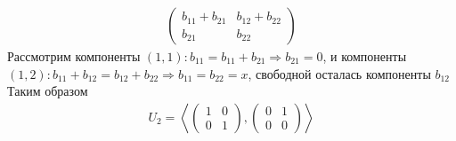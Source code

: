 \begin{itemize}
\begin{gather}
        \begin{pmatrix}
            b_{11} + b_{21} & b_{12} + b_{22} \\
            b_{21} & b_{22}
        \end{pmatrix}
    \end{gather}
    Рассмотрим компоненты $(1, 1):b_{11} = b_{11} + b_{21} \Longrightarrow b_{21} = 0$, и компоненты $(1,2): b_{11} + b_{12} = b_{12} + b_{22} \Longrightarrow b_{11}=b_{22}=x$, свободной осталась компоненты $b_{12}$
    Таким образом
    \begin{gather}
        U_2 =
        \left<
            \begin{pmatrix}
                1 & 0 \\
                0 & 1
            \end{pmatrix},
            \begin{pmatrix}
                0 & 1 \\
                0 & 0
            \end{pmatrix}
        \right>
    \end{gather}
\end{itemize}

